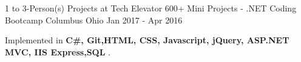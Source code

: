 \begin{cventries}
  \cventry
    {1 to 3-Person(s) Projects at Tech Elevator}
    {600+ Mini Projects - .NET Coding Bootcamp}
    {Columbus Ohio}
    {Jan 2017 - Apr 2016}
    {
      \begin{cvitems}
        \item {Implemented in \textbf{C\#, Git,HTML, CSS, Javascript, jQuery, ASP.NET MVC, IIS Express,SQL }.}     
      \end{cvitems}
    } 
\end{cventries}
